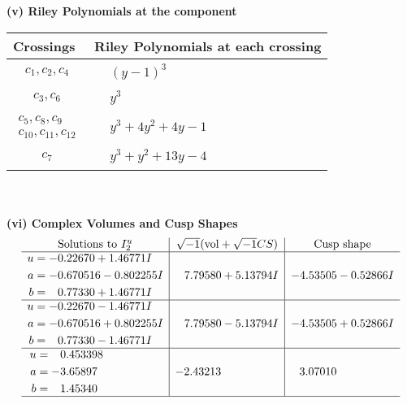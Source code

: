 \documentclass[1p]{elsarticle_modified}
\theoremstyle{definition}
\newcommand{\I}{\sqrt{-1}}
\begin{document}
\flushleft \textbf{(v) Riley Polynomials at the component}\newline \\
\begin{tabular}{m{50pt}|m{274pt}}
Crossings & \hspace{64pt}Riley Polynomials at each crossing \\
\hline $$\begin{aligned}c_{1},c_{2},c_{4}\end{aligned}$$&$\begin{aligned}
&(y-1)^3
\end{aligned}$\\
\hline $$\begin{aligned}c_{3},c_{6}\end{aligned}$$&$\begin{aligned}
&y^3
\end{aligned}$\\
\hline $$\begin{aligned}c_{5},c_{8},c_{9}\\c_{10},c_{11},c_{12}\end{aligned}$$&$\begin{aligned}
&y^3+4 y^2+4 y-1
\end{aligned}$\\
\hline $$\begin{aligned}c_{7}\end{aligned}$$&$\begin{aligned}
&y^3+y^2+13 y-4
\end{aligned}$\\
\hline
\end{tabular}\\~\\
\newpage\flushleft \textbf{(vi) Complex Volumes and Cusp Shapes}
$$\begin{array}{c|c|c}  
\text{Solutions to }I^u_{2}& \I (\text{vol} + \sqrt{-1}CS) & \text{Cusp shape}\\
 \hline 
\begin{aligned}
u &= -0.22670 + 1.46771 I \\
a &= -0.670516 - 0.802255 I \\
b &= \phantom{-}0.77330 + 1.46771 I\end{aligned}
 & \phantom{-}7.79580 + 5.13794 I & -4.53505 - 0.52866 I \\ \hline\begin{aligned}
u &= -0.22670 - 1.46771 I \\
a &= -0.670516 + 0.802255 I \\
b &= \phantom{-}0.77330 - 1.46771 I\end{aligned}
 & \phantom{-}7.79580 - 5.13794 I & -4.53505 + 0.52866 I \\ \hline\begin{aligned}
u &= \phantom{-}0.453398\phantom{ +0.000000I} \\
a &= -3.65897\phantom{ +0.000000I} \\
b &= \phantom{-}1.45340\phantom{ +0.000000I}\end{aligned}
 & -2.43213\phantom{ +0.000000I} & \phantom{-}3.07010\phantom{ +0.000000I}\\
 \hline 
 \end{array}$$\newpage\newpage\renewcommand{\arraystretch}{1}
\end{document}
